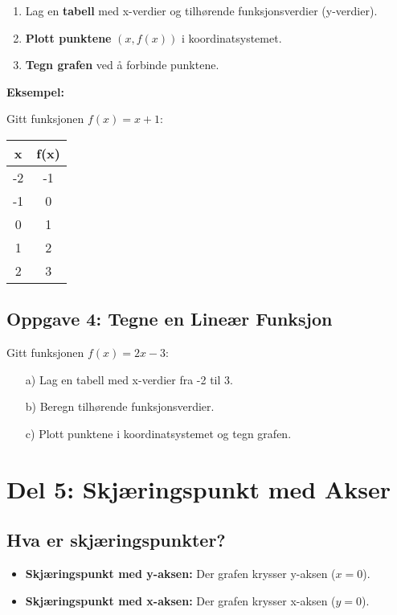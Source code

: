 \documentclass[12pt]{article}
\begin{document}
\begin{enumerate}
    \item Lag en \textbf{tabell} med x-verdier og tilhørende funksjonsverdier (y-verdier).
    \item \textbf{Plott punktene} \( (x, f(x)) \) i koordinatsystemet.
    \item \textbf{Tegn grafen} ved å forbinde punktene.
\end{enumerate}

\textbf{Eksempel:}

Gitt funksjonen \( f(x) = x + 1 \):

\begin{center}
\begin{tabular}{c|c}
    x & f(x) \\
    \hline
    -2 & -1 \\
    -1 & 0 \\
    0 & 1 \\
    1 & 2 \\
    2 & 3 \\
\end{tabular}
\end{center}

\subsection*{Oppgave 4: Tegne en Lineær Funksjon}

Gitt funksjonen \( f(x) = 2x - 3 \):

\begin{enumerate}
    \item[a)] Lag en tabell med x-verdier fra -2 til 3.
    \item[b)] Beregn tilhørende funksjonsverdier.
    \item[c)] Plott punktene i koordinatsystemet og tegn grafen.
\end{enumerate}

\section*{Del 5: Skjæringspunkt med Akser}

\subsection*{Hva er skjæringspunkter?}

\begin{itemize}
    \item \textbf{Skjæringspunkt med y-aksen:} Der grafen krysser y-aksen (\( x = 0 \)).
    \item \textbf{Skjæringspunkt med x-aksen:} Der grafen krysser x-aksen (\( y = 0 \)).
\end{itemize}
\end{document}

